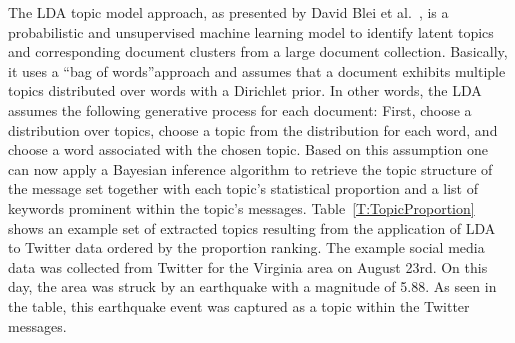 The LDA topic model approach, as presented by David Blei et al.~\cite{Blei:2003:LDA}, 
is a probabilistic and unsupervised machine learning model to identify latent topics and corresponding document clusters from a large document collection.
Basically, it uses a \textquotedblleft bag of words\textquotedblright approach and assumes that a document exhibits multiple topics 
distributed over words with a Dirichlet prior. 
In other words, the LDA assumes the following generative process for each document: 
First, choose a distribution over topics, choose a topic from the distribution for each word,
and choose a word associated with the chosen topic.
Based on this assumption one can now apply a Bayesian inference algorithm to retrieve the topic structure of the message set together with each topic's statistical proportion and a list of keywords prominent within the topic's messages.
Table~\ref{T:TopicProportion} shows an example set of extracted topics resulting from the application of LDA to Twitter data ordered by the proportion ranking. The example social media data was collected from Twitter for the Virginia area on August 23rd.
On this day, the area was struck by an earthquake with a magnitude of 5.88.
As seen in the table, this earthquake event was captured as a topic within the Twitter messages.

